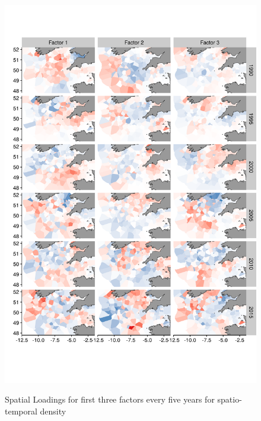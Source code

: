 \documentclass[12pt]{article}
\begin{document}
\begin{linenumbers}
\begin{figure}[!ht]
\begin{center}
	\includegraphics[width = 0.75\linewidth]{"../figures/Suppl - SpatioTempLoadingsEpsilon2"}
	\label{fig:S7}
	\caption{Spatial Loadings for first three factors every five years for
	spatio-temporal density}
	\end{center}
\end{figure}



\end{linenumbers}
\end{document}

